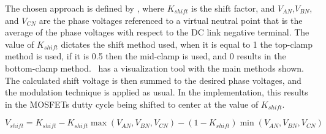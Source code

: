 The chosen approach is defined by , where $K_{shift}$ is the shift factor, and $V_{AN}$,$V_{BN}$, and $V_{CN}$ are the phase voltages referenced to a virtual neutral point that is the average of the phase voltages with respect to the DC link negative terminal. The value of $K_{shift}$ dictates the shift method used, when it is equal to 1 the top-clamp method is used, if it is 0.5 then the mid-clamp is used, and 0 results in the bottom-clamp method.~\citet{Microchip:ZSM_viewer:2023} has a visualization tool with the main methods shown. The calculated shift voltage is then summed to the desired phase voltages, and the modulation technique is applied as usual. In the implementation, this results in the MOSFETs dutty cycle being shifted to center at the value of $K_{shift}$.

\begin{equation}
	V_{shift} = K_{shift} - K_{shift} \max \left(V_{AN},V_{BN},V_{CN}\right) - (1-K_{shift}) \min \left(V_{AN},V_{BN},V_{CN}\right)
	\label{eq:neutral_point_shift}
\end{equation}
